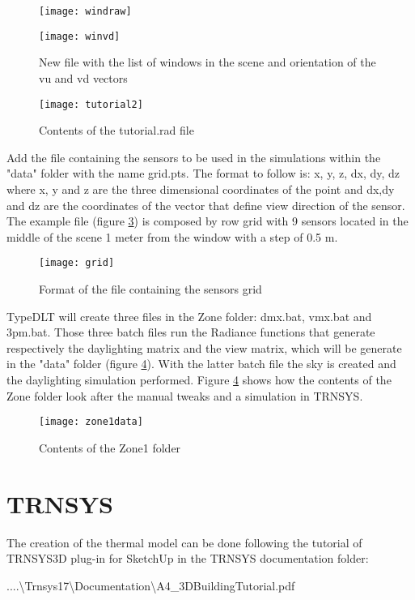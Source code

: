 \begin{figure}[h]
\centering
\begin{minipage}[c]{0.6\linewidth}
\texttt{[image: windraw]}
\end{minipage}
\quad
\begin{minipage}[c]{0.3\linewidth}
\texttt{[image: winvd]}
\end{minipage}
\caption{\label{img4:windoworient} New file with the list of windows in the scene and orientation of the vu and vd vectors}
\end{figure}


\begin{figure}[h]
\centering
\texttt{[image: tutorial2]}
\caption{\label{img4:tutorial2} Contents of the tutorial.rad file}
\end{figure}

Add the file containing the sensors to be used in the simulations within the "data" folder with the name {\color{blue}grid.pts}. The format to follow is: x, y, z, dx, dy, dz where x, y and z are the three dimensional coordinates of the point and dx,dy and dz are the coordinates of the vector that define view direction of the sensor.
The example file (figure \ref{img4:grid}) is composed by row grid with 9 sensors located in the middle of the scene 1 meter from the window with a step of 0.5 m.

\begin{figure}[H]
\centering
\texttt{[image: grid]}
\caption{\label{img4:grid} Format of the file containing the sensors grid}
\end{figure}


TypeDLT will create three files in the Zone folder: dmx.bat, vmx.bat and 3pm.bat. Those three batch files run the Radiance functions that generate respectively the daylighting matrix and the view matrix, which will be generate in the "data" folder (figure \ref{img4:zone1data}). With the latter batch file the sky is created and the daylighting simulation performed. Figure \ref{img4:zone1data} shows how the contents of the Zone folder look after the manual tweaks and a simulation in TRNSYS.


\begin{figure}[h]
\centering
\texttt{[image: zone1data]}
\caption{\label{img4:zone1data} Contents of the Zone1 folder}
\end{figure}



\section{TRNSYS}
The creation of the thermal model can be done following the tutorial of TRNSYS3D plug-in for SketchUp in the TRNSYS documentation folder:
\begin{center}
....\textbackslash Trnsys17\textbackslash Documentation\textbackslash A4\_3DBuildingTutorial.pdf
\end{center} 

